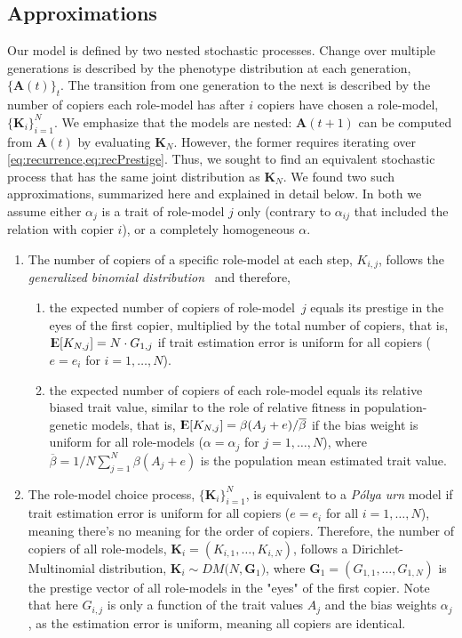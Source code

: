 \documentclass[12pt]{extarticle}
\DeclareMathOperator*{\E}{{\rm I\kern-.3em E}}
\let\vec\mathbf
\begin{document}
\subsection{Approximations}
Our model is defined by two nested stochastic processes. Change over multiple generations is described by the phenotype distribution at each generation, $\{\vec{A}(t)\}_t$. The transition from one generation to the next is described by the number of copiers each role-model has after $i$ copiers have chosen a role-model, $\{\vec{K}_i\}_{i=1}^N$.
We emphasize that the models are nested: $\vec{A}(t+1)$ can be computed from $\vec{A}(t)$ by evaluating $\vec{K}_{N}$. However, the former requires iterating over \cref{eq:recurrence,eq:recPrestige}. Thus, we sought to find an equivalent stochastic process that has the same joint distribution as $\vec{K}_{N}$. 
We found two such approximations, summarized here and explained in detail below. In both we assume either $\alpha_j$ is a trait of role-model $j$ only (contrary to $\alpha_{ij}$ that included the relation with copier $i$), or a completely homogeneous $\alpha$.
\begin{enumerate}
\item 
The number of copiers of a specific role-model at each step, $K_{i,j}$, follows the {\em generalized binomial distribution}~\citep{GBD} and therefore,
\begin{enumerate}\item the expected number of copiers of role-model~$j$ equals its prestige in the eyes of the first copier, multiplied by the total number of copiers, that is,
$\E[K_{N,j}] = N \cdot G_{1,j}$ if trait estimation error is uniform for all copiers ($e=e_i$ for $i=1, \ldots, N$).
\item the expected number of copiers of each role-model equals its relative biased trait value, similar to the role of relative fitness in population-genetic models, that is, $\E[K_{N,j}] = \beta(A_j+e) / \overline{\beta}$ if the bias weight is uniform for all role-models ($\alpha=\alpha_j$ for $j=1,\ldots,N$), where $\overline{\beta}=1/N \sum_{j=1}^{N}{\beta(A_j+e)}$ is the population mean estimated trait value. 
\end{enumerate}
\item The role-model choice process, $\{\vec{K}_{i}\}_{i=1}^{N}$, is equivalent to a {\em P\'{o}lya urn} model if trait estimation error is uniform for all copiers ($e=e_i$ for all $i=1, \ldots, N$), meaning there's no meaning for the order of copiers. 
Therefore, the number of copiers of all role-models, $\vec{K}_i = (K_{i,1}, \ldots, K_{i,N})$, follows a Dirichlet-Multinomial distribution,
$\vec{K}_i \sim \mathit{DM}\big(N, \vec{G}_1\big)$, where $\vec{G}_1 = (G_{1,1}, \ldots, G_{1,N})$ is the prestige vector of all role-models in the "eyes" of the first copier.
Note that here $G_{i,j}$ is only a function of the trait values $A_j$ and the bias weights $\alpha_j$, as the estimation error is uniform, meaning all copiers are identical.
\end{enumerate}
\end{document}
